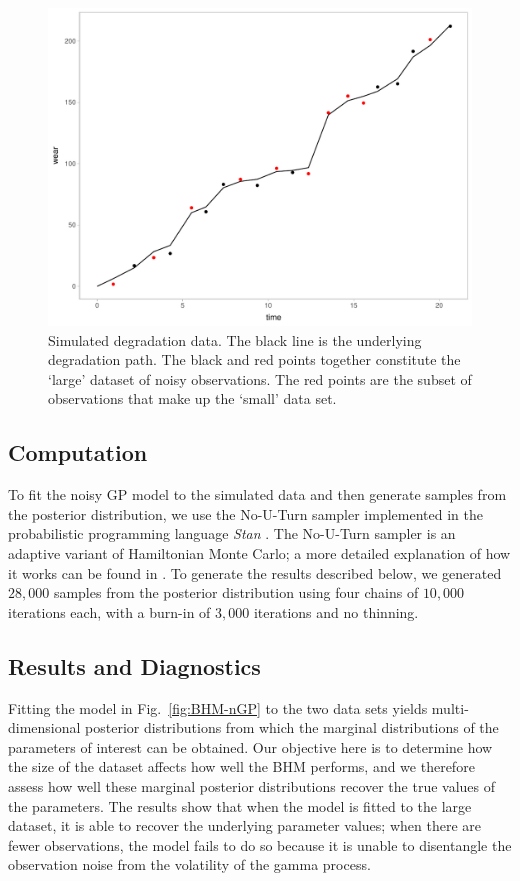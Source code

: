 \documentclass{article}
\begin{document}
\begin{figure}[t]
    \centering
    \includegraphics[width=0.6\columnwidth]{../figures/SimData.pdf}
    \caption{Simulated degradation data. The black line is the underlying degradation path. The black and red points together constitute the `large' dataset of noisy observations. The red points are the subset of observations that make up the `small' data set.}
    \label{fig:sim-data}
\end{figure}


\subsection{Computation}

To fit the noisy GP model to the simulated data and then generate samples from the posterior distribution, we use the No-U-Turn sampler implemented in the probabilistic programming language \textit{Stan} \citep{Stan_2022}. The No-U-Turn sampler is an adaptive variant of Hamiltonian Monte Carlo; a more detailed explanation of how it works can be found in \citet{Hoffman_2014}. To generate the results described below, we generated $28,000$ samples from the posterior distribution using four chains of $10,000$ iterations each, with a burn-in of $3,000$ iterations and no thinning.


\subsection{Results and Diagnostics}

Fitting the model in Fig.~\ref{fig:BHM-nGP} to the two data sets yields multi-dimensional posterior distributions from which the marginal distributions of the parameters of interest can be obtained. Our objective here is to determine how the size of the dataset affects how well the BHM performs, and we therefore assess how well these marginal posterior distributions recover the true values of the parameters. The results show that when the model is fitted to the large dataset, it is able to recover the underlying parameter values; when there are fewer observations, the model fails to do so because it is unable to disentangle the observation noise from the volatility of the gamma process.
\end{document}
